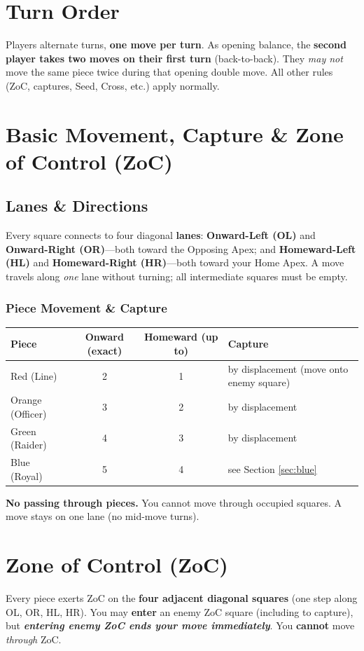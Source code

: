 \documentclass[11pt]{article}
\begin{document}
\section{Turn Order}
\label{sec:turnorder}

Players alternate turns, \textbf{one move per turn}. As opening balance, the \textbf{second player takes two moves on their first turn} (back-to-back). They \emph{may not} move the same piece twice during that opening double move. All other rules (ZoC, captures, Seed, Cross, etc.) apply normally.

\section{Basic Movement, Capture \& Zone of Control (ZoC)}
\label{sec:movement}

\subsection*{Lanes \& Directions}
Every square connects to four diagonal \textbf{lanes}: \textbf{Onward-Left (OL)} and \textbf{Onward-Right (OR)}---both toward the Opposing Apex; and \textbf{Homeward-Left (HL)} and \textbf{Homeward-Right (HR)}---both toward your Home Apex. A move travels along \emph{one} lane without turning; all intermediate squares must be empty.

\subsubsection*{Piece Movement \& Capture}
\begin{tabularx}{\linewidth}{@{}l c c l@{}}
\toprule
\textbf{Piece} & \textbf{Onward (exact)} & \textbf{Homeward (up to)} & \textbf{Capture}\\
\midrule
Red (Line)      & 2 & 1 & by displacement (move onto enemy square)\\
Orange (Officer)& 3 & 2 & by displacement\\
Green (Raider)  & 4 & 3 & by displacement\\
Blue (Royal)    & 5 & 4 & see Section \ref{sec:blue}\\
\bottomrule
\end{tabularx}

\medskip
\noindent\textbf{No passing through pieces.} You cannot move through occupied squares. A move stays on one lane (no mid-move turns).

\section*{Zone of Control (ZoC)}
Every piece exerts ZoC on the \textbf{four adjacent diagonal squares} (one step along OL, OR, HL, HR). You may \textbf{enter} an enemy ZoC square (including to capture), but \textbf{\emph{entering enemy ZoC ends your move immediately}}. You \textbf{cannot} move \emph{through} ZoC.
\end{document}
